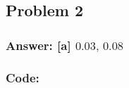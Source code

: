\documentclass[11pt]{article}
\begin{document}
    \hypertarget{problem-2}{%
\subsection{Problem 2}\label{problem-2}}

\hypertarget{answer-a-0.030.08}{%
\subsubsection{\texorpdfstring{Answer: {[}a{]}
\(0.03,\,0.08\)}{Answer: {[}a{]} 0.03,\textbackslash{},0.08}}\label{answer-a-0.030.08}}

\hypertarget{code}{%
\subsubsection{Code:}\label{code}}
\end{document}
